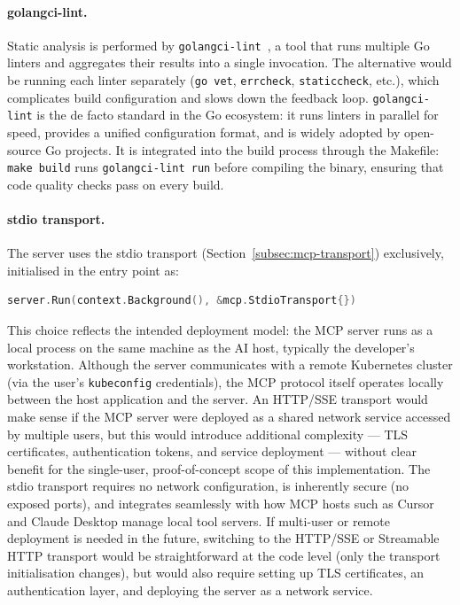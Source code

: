\documentclass[
  digital,     %
  oneside,     %
  nosansbold,  %
  nocolorbold, %
  lof,         %
  lot,         %
]{fithesis4}
\begin{document}
\paragraph{golangci-lint.}
Static analysis is performed by
\texttt{golangci-lint}~\parencite{golangci-lint}, a tool that runs multiple
Go linters and aggregates their results into a single invocation. The alternative
would be running each linter separately (\texttt{go vet}, \texttt{errcheck},
\texttt{staticcheck}, etc.), which complicates build configuration and
slows down the feedback loop. \texttt{golangci-lint} is the de facto
standard in the Go ecosystem: it runs linters in parallel for speed,
provides a unified configuration format, and is widely adopted by
open-source Go projects. It is integrated into the build process through
the Makefile: \texttt{make build} runs \texttt{golangci-lint run} before
compiling the binary, ensuring that code quality checks pass on every build.

\paragraph{stdio transport.}
The server uses the stdio transport
(Section~\ref{subsec:mcp-transport}) exclusively, initialised in the entry
point as:

\begin{lstlisting}[language=Go]
server.Run(context.Background(), &mcp.StdioTransport{})
\end{lstlisting}

This choice reflects the intended deployment model: the MCP server runs as
a local process on the same machine as the AI host, typically the
developer's workstation. Although the server communicates with a remote
Kubernetes cluster (via the user's \texttt{kubeconfig} credentials), the
MCP protocol itself operates locally between the host application and the
server. An HTTP/SSE transport would make sense if the MCP server were
deployed as a shared network service accessed by multiple users, but this
would introduce additional complexity --- TLS certificates, authentication
tokens, and service deployment --- without clear benefit for the
single-user, proof-of-concept scope of this implementation. The stdio
transport requires no network configuration, is inherently secure (no
exposed ports), and integrates seamlessly with how MCP hosts such as Cursor
and Claude Desktop manage local tool servers. If multi-user or remote deployment is needed in the future, switching to
the HTTP/SSE or Streamable HTTP transport would be straightforward at the
code level (only the transport initialisation changes), but would also
require setting up TLS certificates, an authentication layer, and deploying
the server as a network service.
\end{document}
